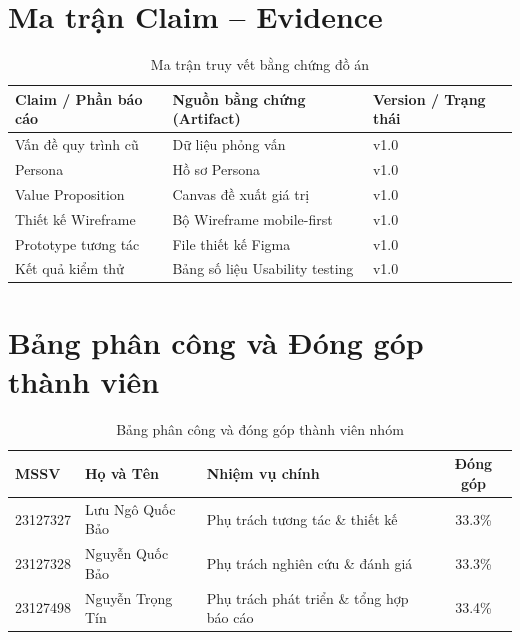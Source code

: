 \newpage
\appendix
\section{Ma trận Claim -- Evidence}

\begin{table}[H]
\centering
\begin{tabularx}{\textwidth}{|l|X|l|}
\hline
\textbf{Claim / Phần báo cáo} & \textbf{Nguồn bằng chứng (Artifact)} & \textbf{Version / Trạng thái} \\ \hline
Vấn đề quy trình cũ & Dữ liệu phỏng vấn & v1.0 \\ \hline
Persona & Hồ sơ Persona & v1.0 \\ \hline
Value Proposition & Canvas đề xuất giá trị & v1.0 \\ \hline
Thiết kế Wireframe & Bộ Wireframe mobile-first & v1.0 \\ \hline
Prototype tương tác & File thiết kế Figma & v1.0 \\ \hline
Kết quả kiểm thử & Bảng số liệu Usability testing & v1.0 \\ \hline
\end{tabularx}
\caption{Ma trận truy vết bằng chứng đồ án}
\label{tab:claim_evidence}
\end{table}

\newpage
\section{Bảng phân công và Đóng góp thành viên}

\begin{table}[H]
\centering
\begin{tabularx}{\textwidth}{|l|l|X|c|}
\hline
\textbf{MSSV} & \textbf{Họ và Tên} & \textbf{Nhiệm vụ chính} & \textbf{Đóng góp} \\ \hline
23127327 & Lưu Ngô Quốc Bảo & Phụ trách tương tác \& thiết kế & 33.3\% \\ \hline
23127328 & Nguyễn Quốc Bảo & Phụ trách nghiên cứu \& đánh giá & 33.3\% \\ \hline
23127498 & Nguyễn Trọng Tín & Phụ trách phát triển \& tổng hợp báo cáo & 33.4\% \\ \hline
\end{tabularx}
\caption{Bảng phân công và đóng góp thành viên nhóm}
\label{tab:team_contribution}
\end{table}
